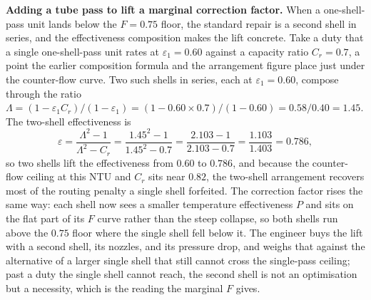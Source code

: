 



\textbf{Adding a tube pass to lift a marginal correction factor.} When a
one-shell-pass unit lands below the $F = 0.75$ floor, the standard repair is a second
shell in series, and the effectiveness composition makes the lift concrete. Take a
duty that a single one-shell-pass unit rates at $\varepsilon_1 = 0.60$ against a
capacity ratio $C_r = 0.7$, a point the earlier composition formula and the arrangement
figure place just under the counter-flow curve. Two such shells in series, each at
$\varepsilon_1 = 0.60$, compose through the ratio $\Lambda = (1 - \varepsilon_1 C_r)/
(1 - \varepsilon_1) = (1 - 0.60\times 0.7)/(1 - 0.60) = 0.58/0.40 = 1.45$. The
two-shell effectiveness is
\[
\varepsilon = \frac{\Lambda^2 - 1}{\Lambda^2 - C_r}
= \frac{1.45^2 - 1}{1.45^2 - 0.7}
= \frac{2.103 - 1}{2.103 - 0.7} = \frac{1.103}{1.403} = 0.786,
\]
so two shells lift the effectiveness from $0.60$ to $0.786$, and because the counter-flow
ceiling at this NTU and $C_r$ sits near $0.82$, the two-shell arrangement recovers most
of the routing penalty a single shell forfeited. The correction factor rises the same
way: each shell now sees a smaller temperature effectiveness $P$ and sits on the flat
part of its $F$ curve rather than the steep collapse, so both shells run above the
$0.75$ floor where the single shell fell below it. The engineer buys the lift with a
second shell, its nozzles, and its pressure drop, and weighs that against the
alternative of a larger single shell that still cannot cross the single-pass ceiling;
past a duty the single shell cannot reach, the second shell is not an optimisation but
a necessity, which is the reading the marginal $F$ gives.


